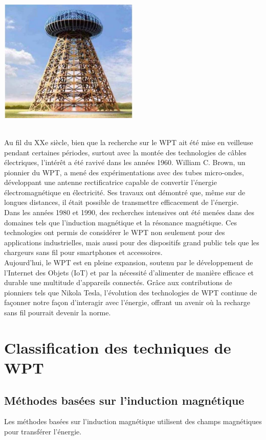\documentclass[12pt,a4paper,titlepage,notitlepage]{article}
\begin{document}
	\begin{center} \includegraphics[width=0.5\textwidth]{tour_tesla} \end{center} \ \\
	Au fil du XXe siècle, bien que la recherche sur le WPT ait été mise en veilleuse pendant certaines périodes, surtout avec la montée des technologies de câbles électriques, l'intérêt a été ravivé dans les années 1960. William C. Brown, un pionnier du WPT, a mené des expérimentations avec des tubes micro-ondes, développant une antenne rectificatrice capable de convertir l'énergie électromagnétique en électricité. Ses travaux ont démontré que, même sur de longues distances, il était possible de transmettre efficacement de l'énergie.\\
	
	Dans les années 1980 et 1990, des recherches intensives ont été menées dans des domaines tels que l'induction magnétique et la résonance magnétique. Ces technologies ont permis de considérer le WPT non seulement pour des applications industrielles, mais aussi pour des dispositifs grand public tels que les chargeurs sans fil pour smartphones et accessoires.\\
	
	Aujourd'hui, le WPT est en pleine expansion, soutenu par le développement de l'Internet des Objets (IoT) et par la nécessité d'alimenter de manière efficace et durable une multitude d'appareils connectés. Grâce aux contributions de pionniers tels que Nikola Tesla, l'évolution des technologies de WPT continue de façonner notre façon d'interagir avec l'énergie, offrant un avenir où la recharge sans fil pourrait devenir la norme.
	
	
	\newpage
	\section{Classification des techniques de WPT}
	
	\subsection{Méthodes basées sur l’induction magnétique}
	Les méthodes basées sur l'induction magnétique utilisent des champs magnétiques pour transférer l'énergie.\\
	
\end{document}

